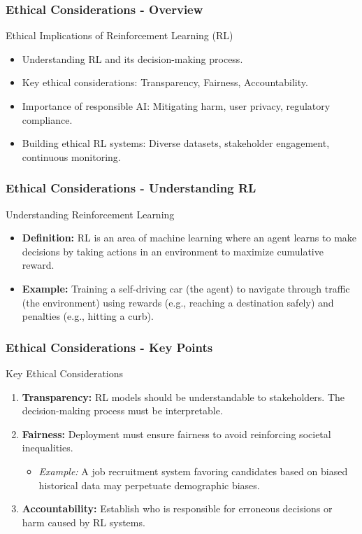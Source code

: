\documentclass{beamer}
\begin{document}
\begin{frame}[fragile]
    \frametitle{Ethical Considerations - Overview}
    \begin{block}{Ethical Implications of Reinforcement Learning (RL)}
        \begin{itemize}
            \item Understanding RL and its decision-making process.
            \item Key ethical considerations: Transparency, Fairness, Accountability.
            \item Importance of responsible AI: Mitigating harm, user privacy, regulatory compliance.
            \item Building ethical RL systems: Diverse datasets, stakeholder engagement, continuous monitoring.
        \end{itemize}
    \end{block}
\end{frame}

\begin{frame}[fragile]
    \frametitle{Ethical Considerations - Understanding RL}
    \begin{block}{Understanding Reinforcement Learning}
        \begin{itemize}
            \item \textbf{Definition:} RL is an area of machine learning where an agent learns to make decisions by taking actions in an environment to maximize cumulative reward.
            \item \textbf{Example:} Training a self-driving car (the agent) to navigate through traffic (the environment) using rewards (e.g., reaching a destination safely) and penalties (e.g., hitting a curb).
        \end{itemize}
    \end{block}
\end{frame}

\begin{frame}[fragile]
    \frametitle{Ethical Considerations - Key Points}
    \begin{block}{Key Ethical Considerations}
        \begin{enumerate}
            \item \textbf{Transparency:} RL models should be understandable to stakeholders. The decision-making process must be interpretable.
            \item \textbf{Fairness:} Deployment must ensure fairness to avoid reinforcing societal inequalities. 
                \begin{itemize}
                    \item \textit{Example:} A job recruitment system favoring candidates based on biased historical data may perpetuate demographic biases.
                \end{itemize}
            \item \textbf{Accountability:} Establish who is responsible for erroneous decisions or harm caused by RL systems.
        \end{enumerate}
    \end{block}
\end{frame}
\end{document}
